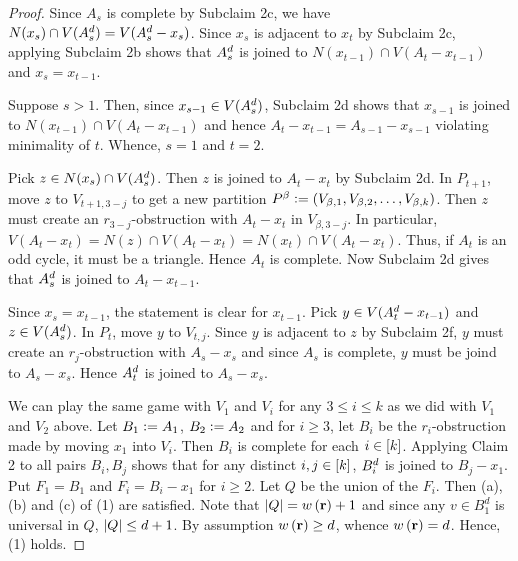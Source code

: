 \begin{proof}

			Since $A_s$ is complete by Subclaim 2c, we have $N(x_s) \cap V(A_s^{d}) = V(A_s^{d} - x_s)$.  Since $x_s$ is adjacent to $x_t$ by Subclaim 2c, applying Subclaim 2b shows that $A_s^{d}$ is joined to $N(x_{t-1}) \cap V(A_t - x_{t-1})$ and $x_s = x_{t-1}$.  
			

			Suppose $s > 1$.  Then, since $x_{s-1} \in V(A_s^{d})$, Subclaim 2d shows that $x_{s-1}$ is joined to $N(x_{t-1}) \cap V(A_t - x_{t-1})$ and hence $A_t - x_{t-1} = A_{s - 1} - x_{s-1}$ violating
			minimality of $t$.  Whence, $s = 1$ and $t=2$.
				

			Pick $z \in N(x_s) \cap V(A_s^{d})$.  Then $z$ is joined to $A_t-x_t$ by Subclaim 2d.
			In $P_{t+1}$, move $z$ to $V_{t+1, 3-j}$ to
			get a new partition $P^{\beta} \mathrel{\mathop:}= \left( V_{\beta, 1},
			V_{\beta, 2}, \ldots, V_{\beta, k} \right)$. Then $z$ must create an
			$r_{3-j}$-obstruction with $A_t - x_t$ in $V_{\beta, 3-j}$.  In
			particular, $V(A_t - x_t) = N(z) \cap V(A_t - x_t) = N(x_t) \cap V(A_t - x_t)$. Thus, if $A_t$ is an odd cycle, it must be a triangle.  	Hence $A_t$ is complete. Now Subclaim 2d gives that $A_s^{d}$ is joined to $A_t - x_{t-1}$.

			
			Since $x_s = x_{t-1}$, the statement is clear for $x_{t-1}$. Pick $y \in V(A_t^{d} - x_{t-1})$ and $z \in V(A_s^{d})$. In $P_t$, move $y$ to $V_{t, j}$.  Since $y$ is adjacent to $z$ by Subclaim 2f, $y$ must create an $r_j$-obstruction with $A_s - x_s$ and since $A_s$ is complete, $y$ must be joind to $A_s - x_s$.  Hence $A_t^{d}$ is joined to $A_s - x_s$.
						
         
			We can play the same game with $V_1$ and $V_i$ for any
			$3 \leq i \leq k$ as we did with $V_1$ and $V_2$ above.  Let $B_1 \mathrel{\mathop:}= A_1$, $B_2 \mathrel{\mathop:}= A_2$ and for $i \geq 3$, let $B_i$ be the $r_i$-obstruction made by moving
			$x_1$ into $V_i$.  Then $B_i$ is complete for each $i \in \left[k\right]$. 
			Applying Claim 2 to all pairs $B_i, B_j$ shows that for any
			distinct $i, j \in \left[k\right]$, $B_i^{d}$ is joined to $B_j - x_1$. 
			Put $F_1 = B_1$ and $F_i = B_i - x_1$ for $i \geq 2$.  
			Let $Q$ be the union of the $F_i$.  Then (a), (b) and (c) of (1) are satisfied.
			Note that $\left|Q\right| = w\left( \mathbf{r} \right)+1$ and since any $v \in B_1^d$ is universal in $Q$,
			$\left|Q\right| \leq d + 1$. By assumption $w\left( \mathbf{r} \right) \geq d$, whence $w\left( \mathbf{r} \right)=d$.  
			Hence, (1) holds.
\end{proof}
	
